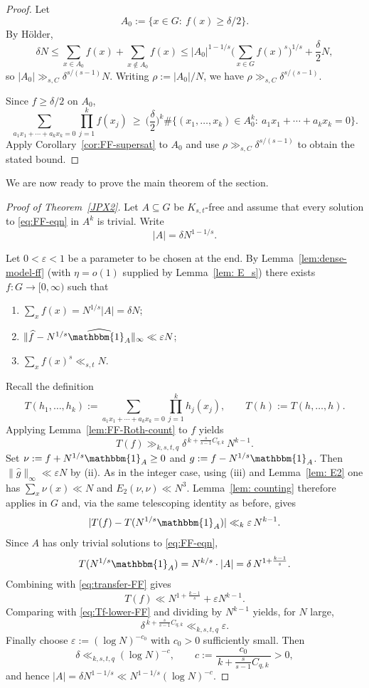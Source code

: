 \documentclass[A4paper,reqno,oneside,12pt]{amsart}
\theoremstyle{plain}
\theoremstyle{definition}
\newcommand{\e}{\mathbbm{1}}          %
\begin{document}
\begin{proof}
Let
\[
A_0:=\{x\in G:\ f(x)\ge \delta/2\}.
\]
By H\"older,
\[
\delta N
\le \sum_{x\in A_0}f(x)+\sum_{x\notin A_0}f(x)
\le |A_0|^{1-1/s}\Big(\sum_{x\in G}f(x)^s\Big)^{1/s}+\frac{\delta}{2}N,
\]
so $|A_0|\gg_{s,C}\delta^{s/(s-1)}N$. Writing $\rho:=|A_0|/N$, we have $\rho\gg_{s,C}\delta^{s/(s-1)}$.

Since $f\ge \delta/2$ on $A_0$,
\[
\sum_{a_1x_1+\cdots+a_kx_k=0}\prod_{j=1}^k f(x_j)
\ \ge\
\Big(\frac{\delta}{2}\Big)^k
\#\{(x_1,\dots,x_k)\in A_0^k:\ a_1x_1+\cdots+a_kx_k=0\}.
\]
Apply Corollary~\ref{cor:FF-supersat} to $A_0$ and use $\rho\gg_{s,C}\delta^{s/(s-1)}$ to obtain the stated bound.
\end{proof}

We are now ready to prove the main theorem of the section. 

\begin{proof}[Proof of Theorem~\ref{JPX2}]
Let $A\subseteq G$ be $K_{s,t}$-free and assume that every solution to \eqref{eq:FF-eqn} in $A^k$ is trivial.
Write
\[
|A|=\delta N^{1-1/s}.
\]

Let $0<\varepsilon<1$ be a parameter to be chosen at the end.
By Lemma~\ref{lem:dense-model-ff} (with $\eta=o(1)$ supplied by Lemma~\ref{lem: E_s}) there exists
$f:G\to[0,\infty)$ such that
\begin{enumerate}[label=(\roman*)]
\item $\sum_x f(x)=N^{1/s}|A|=\delta N$;
\item $\|\widehat f-N^{1/s}\widehat{\e_A}\|_\infty\ll \varepsilon N$;
\item $\sum_x f(x)^s\ll_{s,t} N$.
\end{enumerate}
Recall the definition
\[
T(h_1,\dots,h_k):=\sum_{a_1x_1+\cdots+a_kx_k=0}\prod_{j=1}^k h_j(x_j),
\qquad T(h):=T(h,\dots,h).
\]
Applying Lemma~\ref{lem:FF-Roth-count} to $f$ yields
\begin{equation}\label{eq:Tf-lower-FF}
T(f)\gg_{k,s,t,q}\delta^{\,k+\frac{s}{s-1}C_{q,k}}\,N^{k-1}.
\end{equation}
Set $\nu:=f+N^{1/s}\e_A\ge 0$ and $g:=f-N^{1/s}\e_A$. Then $\|\widehat g\|_\infty\ll \varepsilon N$ by (ii).
As in the integer case, using (iii) and Lemma~\ref{lem: E2} one has $\sum_x\nu(x)\ll N$ and $E_2(\nu,\nu)\ll N^3$.
Lemma~\ref{lem: counting} therefore applies in $G$ and, via the same telescoping identity as before, gives
\begin{equation}\label{eq:transfer-FF}
|T(f)-T(N^{1/s}\e_A)|\ll_k \varepsilon\,N^{k-1}.
\end{equation}
Since $A$ has only trivial solutions to \eqref{eq:FF-eqn},
\[
T(N^{1/s}\e_A)=N^{k/s}\cdot |A|=\delta\,N^{1+\frac{k-1}{s}}.
\]
Combining with \eqref{eq:transfer-FF} gives
\[
T(f)\ll N^{1+\frac{k-1}{s}}+\varepsilon N^{k-1}.
\]
Comparing with \eqref{eq:Tf-lower-FF} and dividing by $N^{k-1}$ yields, for $N$ large,
\[
\delta^{\,k+\frac{s}{s-1}C_{q,k}}\ll_{k,s,t,q}\varepsilon.
\]
Finally choose $\varepsilon:=(\log N)^{-c_0}$ with $c_0>0$ sufficiently small. Then
\[
\delta\ll_{k,s,t,q}(\log N)^{-c},
\qquad
c:=\frac{c_0}{\,k+\frac{s}{s-1}C_{q,k}\,}>0,
\]
and hence $|A|=\delta N^{1-1/s}\ll N^{1-1/s}(\log N)^{-c}$.
\end{proof}
\end{document}
